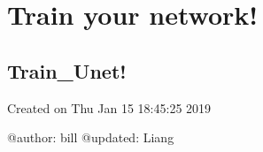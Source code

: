 \documentclass[letterpaper,10pt,english]{sphinxmanual}
\begin{document}
\section{Train your network!}
\label{\detokenize{usage/train:train-your-network}}\label{\detokenize{usage/train::doc}}

\subsection{Train\_Unet!}
\label{\detokenize{usage/train_file:module-train_unet}}\label{\detokenize{usage/train_file:train-unet}}\label{\detokenize{usage/train_file::doc}}
Created on Thu Jan 15 18:45:25 2019

@author: bill
@updated: Liang
\end{document}
